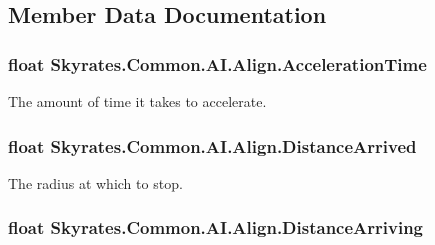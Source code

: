 \subsection{Member Data Documentation}
\hypertarget{class_skyrates_1_1_common_1_1_a_i_1_1_align_ad68c62b0c7bea0bd95caefbc1ce53a95}{
\subsubsection[{Acceleration\-Time}]{\setlength{\rightskip}{0pt plus 5cm}float Skyrates.\-Common.\-A\-I.\-Align.\-Acceleration\-Time}}\label{class_skyrates_1_1_common_1_1_a_i_1_1_align_ad68c62b0c7bea0bd95caefbc1ce53a95}


The amount of time it takes to accelerate. 

\hypertarget{class_skyrates_1_1_common_1_1_a_i_1_1_align_a5edf3eb4764db7b95780b13ea635b4f0}{
\subsubsection[{Distance\-Arrived}]{\setlength{\rightskip}{0pt plus 5cm}float Skyrates.\-Common.\-A\-I.\-Align.\-Distance\-Arrived}}\label{class_skyrates_1_1_common_1_1_a_i_1_1_align_a5edf3eb4764db7b95780b13ea635b4f0}


The radius at which to stop. 

\hypertarget{class_skyrates_1_1_common_1_1_a_i_1_1_align_ad66a5eb87b1ae47307ccfe8b7c33ce18}{
\subsubsection[{Distance\-Arriving}]{\setlength{\rightskip}{0pt plus 5cm}float Skyrates.\-Common.\-A\-I.\-Align.\-Distance\-Arriving}}\label{class_skyrates_1_1_common_1_1_a_i_1_1_align_ad66a5eb87b1ae47307ccfe8b7c33ce18}


